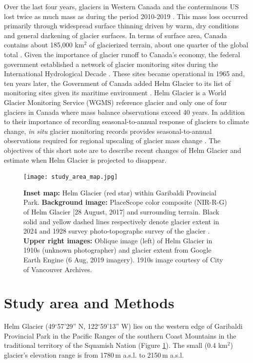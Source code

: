 \documentclass[annals,review,oneside]{igs}
\begin{document}
Over the last four years, glaciers in Western Canada and the conterminous US lost twice as much mass as during the period 2010-2019  \citep{Menounos2025}. This mass loss occurred primarily through widespread surface thinning driven by warm, dry conditions and general darkening of glacier surfaces. In terms of surface area, Canada contains about 185,000 km$^{2}$ of glacierized terrain, about one quarter of the global total \citep{rgi70}.  Given the importance of glacier runoff to Canada's economy, the federal government established a network of glacier monitoring sites during the International Hydrological Decade \citep{Ommanney1986}. These sites became operational in 1965 and, ten years later, the Government of Canada added Helm Glacier to its list of monitoring sites given its maritime environment \cite{Ommanney2002}. Helm Glacier is a World Glacier Monitoring Service (WGMS) reference glacier and only one of four glaciers in Canada where mass balance observations exceed 40 years.  In addition to their importance of recording  seasonal-to-annual response of glaciers to climate change, \emph{in situ} glacier monitoring records provides seasonal-to-annual observations required for regional upscaling of glacier mass change \citep{Zemp2019}. The objectives of this short note are to describe recent changes of Helm Glacier and estimate when Helm Glacier is projected to disappear. 

\begin{figure}[H!]
\centering
\texttt{[image: study\_area\_map.jpg]}
\caption{\textbf{Inset map:} Helm Glacier (red star) within Garibaldi Provincial Park. \textbf{Background image:} PlaceScope color composite (NIR-R-G) of Helm Glacier [28 August, 2017] and surrounding terrain. Black solid and yellow dashed lines respectively denote glacier extent in 2024 and 1928 survey photo-topographc survey of the glacier \citep{Koch2009}. \textbf{Upper right images:} Oblique image (left) of Helm Glacier in 1910s (unknown photographer) and glacier extent from Google Earth Engine (6 Aug, 2019 imagery). 1910s image courtesy of City of Vancouver Archives.}
\label{study_area_map}
\end{figure}

\section{Study area and Methods}

Helm Glacier (49$^{\circ}$57’29” N, 122$^{\circ}$59’13” W) lies on the western edge of Garibaldi Provincial Park in the Pacific Ranges of the southern Coast Mountains in the traditional territory of the Squamish Nation (Figure \ref{study_area_map}). The small (0.4 km$^{2}$) glacier's elevation range is from 1780\,m a.s.l. to 2150\,m a.s.l. 
\end{document}
